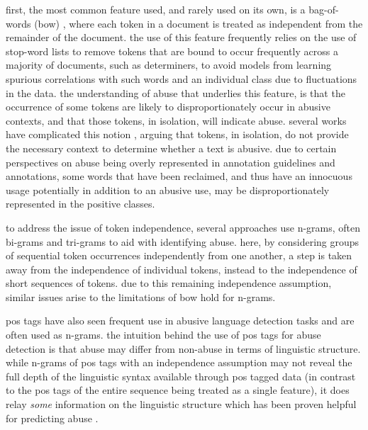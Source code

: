 first, the most common feature used, and rarely used on its own, is a bag-of-words (bow) \citep{fortuna:2018,davidson:2017}, where each token in a document is treated as independent from the remainder of the document. 
the use of this feature frequently relies on the use of stop-word lists to remove tokens that are bound to occur frequently across a majority of documents, such as determiners, to avoid models from learning spurious correlations with such words and an individual class due to fluctuations in the data. 
the understanding of abuse that underlies this feature, is that the occurrence of some tokens are likely to disproportionately occur in abusive contexts, and that those tokens, in isolation, will indicate abuse. 
several works have complicated this notion \citep[e.g.]{waseem:2018,davidson:2019}, arguing that tokens, in isolation, do not provide the necessary context to determine whether a text is abusive.
due to certain perspectives on abuse being overly represented \citep{waseem:2016} in annotation guidelines and annotations, some words that have been reclaimed, and thus have an innocuous usage potentially in addition to an abusive use, may be disproportionately represented in the positive classes.

to address the issue of token independence, several approaches use n-grams, often bi-grams \citep{waseem:2016} and tri-grams \citep{davidson:2017} to aid with identifying abuse. 
here, by considering groups of sequential token occurrences independently from one another, a step is taken away from the independence of individual tokens, instead to the independence of short sequences of tokens. 
due to this remaining independence assumption, similar issues arise to the limitations of bow hold for n-grams.

pos tags have also seen frequent use in abusive language detection tasks \citep{fortuna:2018} and are often used as n-grams. 
the intuition behind the use of pos tags for abuse detection is that abuse may differ from non-abuse in terms of linguistic structure. 
while n-grams of pos tags with an independence assumption may not reveal the full depth of the linguistic syntax available through pos tagged data (in contrast to the pos tags of the entire sequence being treated as a single feature), it does relay \textit{some} information on the linguistic structure which has been proven helpful for predicting abuse \citep{fortuna:2018}.

